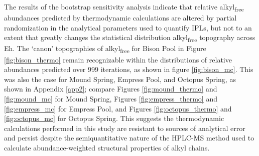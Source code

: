 The results of the bootstrap sensitivity analysis indicate that relative alkyl\textsubscript{free} abundances predicted by thermodynamic calculations are altered by partial randomization in the analytical parameters used to quantify IPLs, but not to an extent that greatly changes the statistical distribution alkyl\textsubscript{free} topography across Eh. The `canon' topographies of alkyl\textsubscript{free} for Bison Pool in Figure \ref{fig:bison_thermo} remain recognizable within the distributions of relative abundances predicted over 999 iterations, as shown in figure \ref{fig:bison_mc}. This was also the case for Mound Spring, Empress Pool, and Octopus Spring, as shown in Appendix \ref{app2}; compare Figures \ref{fig:mound_thermo} and \ref{fig:mound_mc} for Mound Spring, Figures \ref{fig:empress_thermo} and \ref{fig:empress_mc} for Empress Pool, and Figures \ref{fig:octopus_thermo} and \ref{fig:octopus_mc} for Octopus Spring. This suggests the thermodynamic calculations performed in this study are resistant to sources of analytical error and persist despite the semiquantitative nature of the HPLC-MS method used to calculate abundance-weighted structural properties of alkyl chains.


